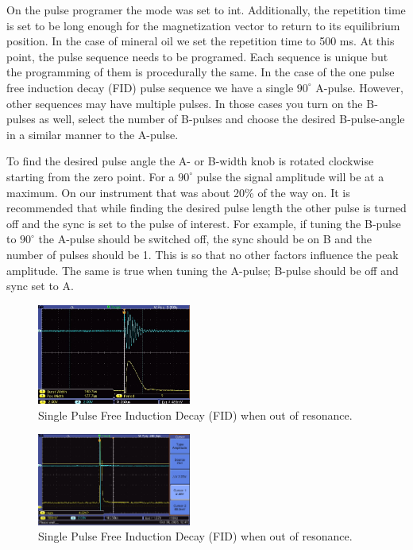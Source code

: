 \documentclass[
reprint,
amsmath,amssymb,
aps,
tikz,
border=5pt
]{revtex4-1}
\begin{document}
    On the pulse programer the mode was set to int. Additionally, the repetition time is set to be long enough for the magnetization vector to return to its equilibrium position. In the case of mineral oil we set the repetition time to 500 ms. At this point, the pulse sequence needs to be programed. Each sequence is unique but the programming of them is procedurally the same. In the case of the one pulse free induction decay (FID) pulse sequence we have a single $90^\circ$ A-pulse. However, other sequences may have multiple pulses. In those cases you turn on the B-pulses as well, select the number of B-pulses and choose the desired B-pulse-angle in a similar manner to the A-pulse. 

    To find the desired pulse angle the A- or B-width knob is rotated clockwise starting from the zero point. For a $90^\circ$ pulse the signal amplitude will be at a maximum. On our instrument that was about 20\% of the way on. It is recommended that while finding the desired pulse length the other pulse is turned off and the sync is set to the pulse of interest. For example, if tuning the B-pulse to $90^\circ$ the A-pulse should be switched off, the sync should be on B and the number of pulses should be 1. This is so that no other factors influence the peak amplitude. The same is true when tuning the A-pulse; B-pulse should be off and sync set to A. 

    
    \begin{figure}
        \includegraphics[width= 0.45\textwidth]{figures/noResonance.JPG}
        \caption{Single Pulse Free Induction Decay (FID) when out of resonance.}
        \label{fig:beats}
    \end{figure}

    \begin{figure}
      \includegraphics[width= 0.45\textwidth]{figures/FID-2.png}
      \caption{Single Pulse Free Induction Decay (FID) when out of resonance.}
      \label{fig:fid}
  \end{figure}
\end{document}
